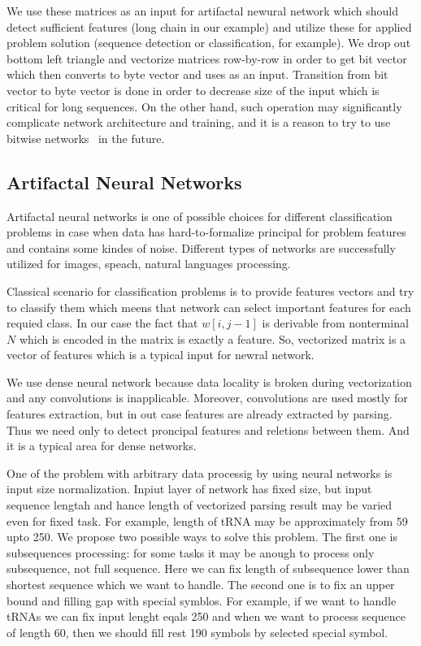 \documentclass[a4paper,twoside]{article}
\begin{document}
We use these matrices as an input for artifactal newural network which should detect sufficient features (long chain in our example) and utilize these for applied problem solution (sequence detection or classification, for example).
We drop out bottom left triangle and vectorize matrices row-by-row in order to get bit vector which then converts to byte vector and uses as an input.
Transition from bit vector to byte vector is done in order to decrease size of the input which is critical for long sequences. 
On the other hand, such operation may significantly complicate network architecture and training, and it is a reason to try to use bitwise networks~\cite{DBLP:journals:corr:KimS16} in the future.  

\subsection{Artifactal Neural Networks}

\noindent Artifactal neural networks is one of possible choices for different classification problems in case when data has hard-to-formalize principal for problem features and contains some kindes of noise. Different types of networks are successfully utilized for images, speach, natural languages processing.

Classical scenario for classification problems is to provide features vectors and try to classify them which meens that network can select important features for each requied class.
In our case the fact that $w[i,j-1]$ is derivable from nonterminal $N$ which is encoded in the matrix is exactly a feature.
So, vectorized matrix is a vector of features which is a typical input for newral network.

We use dense neural network because data locality is broken during vectorization and any convolutions is inapplicable.
Moreover, convolutions are used mostly for features extraction, but in out case features are already extracted by parsing.
Thus we need only to detect proncipal features and reletions between them.
And it is a typical area for dense networks.

One of the problem with arbitrary data processig by using neural networks is input size normalization.
Inpiut layer of network has fixed size, but input sequence lengtah and hance length of vectorized parsing result may be varied even for fixed task.
For example, length of tRNA may be approximately from 59 upto 250.
We propose two possible ways to solve this problem.
The first one is subsequences processing: for some tasks it may be anough to process only subsequence, not full sequence.
Here we can fix length of subsequence lower than shortest sequence which we want to handle. 
The second one is to fix an upper bound and filling gap with special symblos.
For example, if we want to handle tRNAs we can fix input lenght eqals 250 and when we want to process sequence of length 60, then we should fill rest 190 symbols by selected special symbol.
\end{document}

